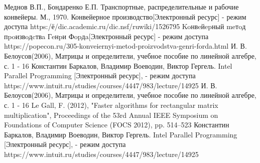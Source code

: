 \documentclass[12pt]{report}
\begin{document}
 \begin{thebibliography}{3}
 Меднов В.П., Бондаренко Е.П. Транспортные, распределительные и рабочие конвейеры. М., 1970.
 Конвейерное производство[Электронный ресурс] - режим доступа https:/ё/dic.academic.ru/dic.nsf/ruwiki/1526795
 Koнвeйepный meтoд пpoизвoдcтвa Гeнpи Фopдa[Электронный ресурс] - режим доступа https://popecon.ru/305-konveiernyi-metod-proizvodstva-genri-forda.html
 И. В. Белоусов(2006), Матрицы и определители, учебное пособие по линейной алгебре, с. 1 - 16
 Константин Баркалов, Владимир Воеводин, Виктор Гергель. Intel Parallel Programming [Электронный ресурс], - режим доступа https://www.intuit.ru/studies/courses/4447/983/lecture/14925
И. В. Белоусов(2006), Матрицы и определители, учебное пособие по линейной алгебре, с. 1 - 16
Le Gall, F. (2012), "Faster algorithms for rectangular matrix multiplication", Proceedings of the 53rd Annual IEEE Symposium on Foundations of Computer Science (FOCS 2012), pp. 514–523
Константин Баркалов, Владимир Воеводин, Виктор Гергель. Intel Parallel Programming [Электронный ресурс], - режим доступа https://www.intuit.ru/studies/courses/4447/983/lecture/14925
\end{thebibliography}
\end{document}
